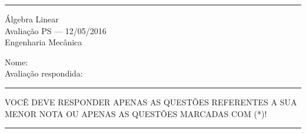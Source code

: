 \documentclass{article}
\begin{document}
\noindent{}\rule{\textwidth}{0.4pt}
\begin{center}
	\'{A}lgebra Linear\\
	Avalia\c{c}\~ao PS --- 12/05/2016 \\
	Engenharia Mec\^anica \\
	\vspace{0.2cm}
\end{center}
Nome: \\
Avalia\c{c}\~ao respondida: \\
\noindent{}\rule{\textwidth}{0.4pt}

\begin{center}
VOC\^E DEVE RESPONDER APENAS AS QUEST\~OES REFERENTES A SUA MENOR NOTA OU APENAS AS QUEST\~OES MARCADAS COM (*)!\@
\end{center}

\noindent{}\rule{\textwidth}{0.4pt}
\end{document}

